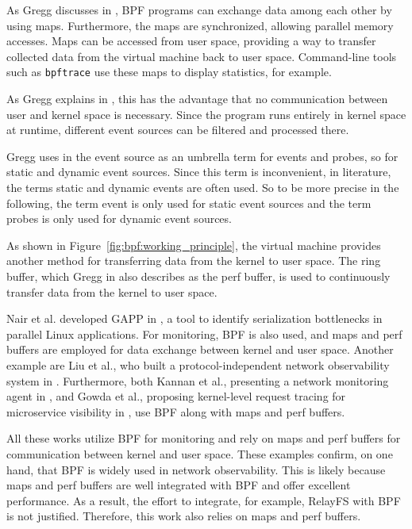 As Gregg discusses in \cite[Chap.~2.2]{Gregg_2020}, \ac{BPF} programs can exchange data among each other by using maps.  
Furthermore, the maps are synchronized, allowing parallel memory accesses.  
Maps can be accessed from user space, providing a way to transfer collected data from the virtual machine back to user space.  
Command-line tools such as \texttt{bpftrace} use these maps to display statistics, for example.  

As Gregg explains in \cite[Chap.~2.2]{Gregg_2020}, this has the advantage that no communication between user and kernel space is necessary.  
Since the program runs entirely in kernel space at runtime, different event sources can be filtered and processed there.  

Gregg uses in \cite[Chap. 2.6]{Gregg_2020} the event source as an umbrella term for events and probes, so for static and dynamic event sources.
Since this term is inconvenient, in literature, the terms static and dynamic events are often used.
So to be more precise in the following, the term event is only used for static event sources and the term probes is only used for dynamic event sources.

As shown in Figure~\ref{fig:bpf:working_principle}, the virtual machine provides another method for transferring data from the kernel to user space.  
The ring buffer, which Gregg in \cite[Chap.~2.3]{Gregg_2020} also describes as the perf buffer, is used to continuously transfer data from the kernel to user space.  

Nair et al. developed GAPP in \cite{Nair_2020}, a tool to identify serialization bottlenecks in parallel Linux applications.  
For monitoring, \ac{BPF} is also used, and maps and perf buffers are employed for data exchange between kernel and user space.  
Another example are Liu et al., who built a protocol-independent network observability system in \cite{9359159}.  
Furthermore, both Kannan et al., presenting a network monitoring agent in \cite{network_obser}, and Gowda et al., proposing kernel-level request tracing for microservice visibility in \cite{V_2022}, use \ac{BPF} along with maps and perf buffers.

All these works utilize \ac{BPF} for monitoring and rely on maps and perf buffers for communication between kernel and user space.  
These examples confirm, on one hand, that \ac{BPF} is widely used in network observability.    
This is likely because maps and perf buffers are well integrated with \ac{BPF} and offer excellent performance.  
As a result, the effort to integrate, for example, RelayFS with \ac{BPF} is not justified.  
Therefore, this work also relies on maps and perf buffers.

